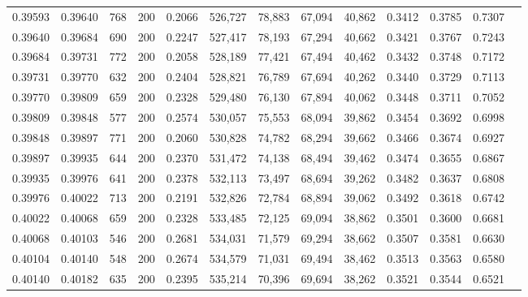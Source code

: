 \begin{tabular}{rrrrrrrrrrrrr}
0.39593 & 0.39640 &   768 & 200 &                                     0.2066 & 526,727 &  78,883 &  67,094 &  40,862 & 0.3412 & 0.3785 & 0.7307 \\
0.39640 & 0.39684 &   690 & 200 &                                     0.2247 & 527,417 &  78,193 &  67,294 &  40,662 & 0.3421 & 0.3767 & 0.7243 \\
0.39684 & 0.39731 &   772 & 200 &                                     0.2058 & 528,189 &  77,421 &  67,494 &  40,462 & 0.3432 & 0.3748 & 0.7172 \\
0.39731 & 0.39770 &   632 & 200 &                                     0.2404 & 528,821 &  76,789 &  67,694 &  40,262 & 0.3440 & 0.3729 & 0.7113 \\
0.39770 & 0.39809 &   659 & 200 &                                     0.2328 & 529,480 &  76,130 &  67,894 &  40,062 & 0.3448 & 0.3711 & 0.7052 \\
0.39809 & 0.39848 &   577 & 200 &                                     0.2574 & 530,057 &  75,553 &  68,094 &  39,862 & 0.3454 & 0.3692 & 0.6998 \\
0.39848 & 0.39897 &   771 & 200 &                                     0.2060 & 530,828 &  74,782 &  68,294 &  39,662 & 0.3466 & 0.3674 & 0.6927 \\
0.39897 & 0.39935 &   644 & 200 &                                     0.2370 & 531,472 &  74,138 &  68,494 &  39,462 & 0.3474 & 0.3655 & 0.6867 \\
0.39935 & 0.39976 &   641 & 200 &                                     0.2378 & 532,113 &  73,497 &  68,694 &  39,262 & 0.3482 & 0.3637 & 0.6808 \\
0.39976 & 0.40022 &   713 & 200 &                                     0.2191 & 532,826 &  72,784 &  68,894 &  39,062 & 0.3492 & 0.3618 & 0.6742 \\
0.40022 & 0.40068 &   659 & 200 &                                     0.2328 & 533,485 &  72,125 &  69,094 &  38,862 & 0.3501 & 0.3600 & 0.6681 \\
0.40068 & 0.40103 &   546 & 200 &                                     0.2681 & 534,031 &  71,579 &  69,294 &  38,662 & 0.3507 & 0.3581 & 0.6630 \\
0.40104 & 0.40140 &   548 & 200 &                                     0.2674 & 534,579 &  71,031 &  69,494 &  38,462 & 0.3513 & 0.3563 & 0.6580 \\
0.40140 & 0.40182 &   635 & 200 &                                     0.2395 & 535,214 &  70,396 &  69,694 &  38,262 & 0.3521 & 0.3544 & 0.6521 \\

\end{tabular}
